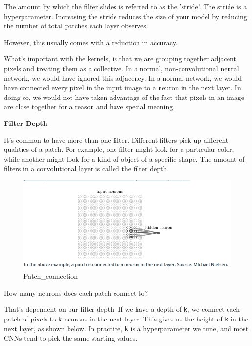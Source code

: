 \documentclass[11pt, a4paper]{article}
\begin{document}
 The amount by which the filter slides is referred to as the 'stride'. The stride is a hyperparameter. Increasing the stride reduces the size of your model by reducing the number of total patches each layer observes.

However, this usually comes with a reduction in accuracy.

What's important with the kernels, is that we are grouping together adjacent pixels and treating them as a collective. In a normal, non-convolutional neural network, we would have ignored this adjacency. In a normal network, we would have connected every pixel in the input image to a neuron in the next layer. In doing so, we would not have taken advantage of the fact that pixels in an image are close together for a reason and have special meaning.


\textbf{Filter Depth}

It's common to have more than one filter. Different filters pick up different qualities of a patch. For example, one filter might look for a particular color, while another might look for a kind of object of a specific shape. The amount of filters in a convolutional layer is called the filter depth.


\begin{figure}[htb!]
	\centering
	\includegraphics[width=0.8\linewidth]{patch_connection}
	\caption{Patch\_connection}
	\label{fig:patch_connection}
\end{figure}


How many neurons does each patch connect to?

That’s dependent on our filter depth. If we have a depth of \texttt{k}, we connect each patch of pixels to \texttt{k} neurons in the next layer. This gives us the height of \texttt{k} in the next layer, as shown below. In practice, \texttt{k} is a hyperparameter we tune, and most CNNs tend to pick the same starting values.
\end{document}
